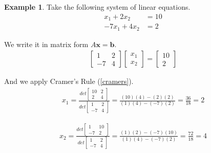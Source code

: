 \documentclass[11pt,reqno]{amsart}
\theoremstyle{definition}
\newtheorem{example}[theorem]{Example}
\begin{document}
\begin{example}
\label{exIntro}
Take the following system of linear equations. 
    \begin{align*} 
     x_1 + 2x_2 &= 10 \\ 
    -7x_1 + 4x_2 &= 2
    \end{align*}
    
    We write it in matrix form $A\mathbf{x}=\mathbf{b}$.
    \begin{align*}
    \begin{bmatrix}
     1&2\\ 
    -7&4 
    \end{bmatrix}
    \begin{bmatrix}
     x_1\\ 
     x_2 
    \end{bmatrix}
    = 
     \begin{bmatrix}
     10\\ 
     2 
    \end{bmatrix}
    \end{align*}

    And we apply Cramer's Rule (\ref{cramers}).
    \begin{align*} 
    x_1=\frac{det\begin{bmatrix} 
    10& 2 \\
    2 &4
    \end{bmatrix}
    }
    {det\begin{bmatrix}
    1 & 2\\
    -7&4
    \end{bmatrix}
    }
    = \frac{(10)(4)-(2)(2)}{(1)(4)-(-7)(2)}
    = \frac{36}{18} = 2
    \end{align*}

    \begin{align*} 
    x_2=\frac{det\begin{bmatrix} 
    1 & 10 \\
    -7 & 2
    \end{bmatrix}
    }
    {det\begin{bmatrix}
    1 & 2\\
    -7&4
    \end{bmatrix}
    }
    = \frac{(1)(2)-(-7)(10)}{(1)(4)-(-7)(2)}
    = \frac{72}{18} = 4
    \end{align*}
    
\end{example}
\end{document}

